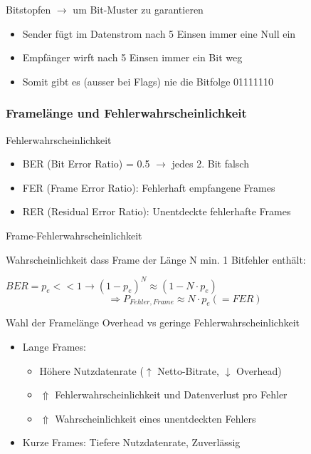 \begin{concept}{Bitstopfen} $\rightarrow$ um Bit-Muster zu garantieren 
    \begin{itemize}
        \item Sender fügt im Datenstrom nach 5 Einsen immer eine Null ein
        \item Empfänger wirft nach 5 Einsen immer ein Bit weg
        \item Somit gibt es (ausser bei Flags) nie die Bitfolge 01111110
    \end{itemize}
\end{concept}

\subsubsection{Framelänge und Fehlerwahrscheinlichkeit}

\begin{definition}{Fehlerwahrscheinlichkeit}
    \begin{itemize}
        \item BER (Bit Error Ratio) = 0.5 $\rightarrow$ jedes 2. Bit falsch
        \item FER (Frame Error Ratio): Fehlerhaft empfangene Frames
        \item RER (Residual Error Ratio): Unentdeckte fehlerhafte Frames
    \end{itemize}
\end{definition}

\begin{KR}{Frame-Fehlerwahrscheinlichkeit}

    Wahrscheinlichkeit dass Frame der Länge N min. 1 Bitfehler enthält:

    \vspace{0.5mm}

    $BER = p_e << 1 \longrightarrow (1 - p_e)^N \approx (1 - N \cdot p_e)$
    $$ \Rightarrow P_{Fehler, Frame} \approx N \cdot p_e (=FER)$$
\end{KR}

\begin{theorem}{Wahl der Framelänge} Overhead vs geringe Fehlerwahrscheinlichkeit
    \begin{itemize}
    \item Lange Frames:
    \begin{itemize}
        \item Höhere Nutzdatenrate ($\uparrow$ Netto-Bitrate, $\downarrow$ Overhead)
        \item $\Uparrow$ Fehlerwahrscheinlichkeit und Datenverlust pro Fehler 
        \item $\Uparrow$ Wahrscheinlichkeit eines unentdeckten Fehlers
    \end{itemize}
    \item Kurze Frames: Tiefere Nutzdatenrate, Zuverlässig
    \end{itemize}
\end{theorem}




